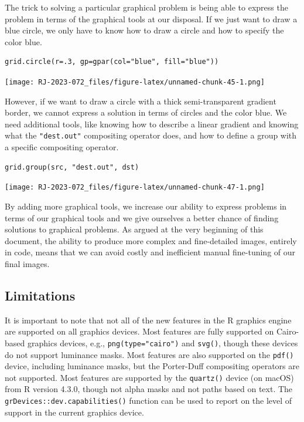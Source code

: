 The trick to solving a particular graphical problem
is being able to express the problem in terms of the graphical
tools at our disposal.
If we just want to draw a blue circle,
we only have to know how to draw a circle
and how to specify the color blue.

\begin{verbatim}
grid.circle(r=.3, gp=gpar(col="blue", fill="blue"))
\end{verbatim}

\texttt{[image: RJ-2023-072\_files/figure-latex/unnamed-chunk-45-1.png]}

However, if we want to draw a circle with a thick semi-transparent gradient
border, we cannot express a solution in terms of circles and the color
blue. We need additional tools, like knowing how to describe a
linear gradient and knowing what the \texttt{"dest.out"} compositing operator does,
and how to define a group with a specific compositing operator.

\begin{verbatim}
grid.group(src, "dest.out", dst)
\end{verbatim}

\texttt{[image: RJ-2023-072\_files/figure-latex/unnamed-chunk-47-1.png]}

By adding more graphical tools, we increase our ability to express
problems in terms of our graphical tools and we
give ourselves a better chance of finding solutions to
graphical problems.
As argued at the very beginning of this document, the ability to produce more
complex and fine-detailed images, entirely in code, means that we can
avoid costly and inefficient manual
fine-tuning of our final images.

\hypertarget{limitations}{%
\subsection{Limitations}\label{limitations}}

It is important to note that not all of the new features
in the R graphics engine are supported
on all graphics devices.
Most features are fully supported on Cairo-based graphics devices, e.g.,
\texttt{png(type="cairo")} and \texttt{svg()}, though these devices do not support
luminance masks.
Most features are also supported on the
\texttt{pdf()} device, including luminance masks, but
the Porter-Duff compositing operators are not supported.
Most features are supported by the \texttt{quartz()} device (on macOS)
from R version 4.3.0, though not alpha masks and not paths based on text.
The \texttt{grDevices::dev.capabilities()} function can be used to report on
the level of support in the current graphics device.

